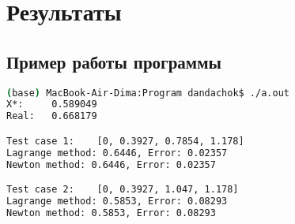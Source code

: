 \section*{Результаты}

\subsection*{Пример работы программы}

\begin{lstlisting}[language=bash]
(base) MacBook-Air-Dima:Program dandachok$ ./a.out
X*:     0.589049
Real:   0.668179

Test case 1:    [0, 0.3927, 0.7854, 1.178]
Lagrange method: 0.6446, Error: 0.02357
Newton method: 0.6446, Error: 0.02357

Test case 2:    [0, 0.3927, 1.047, 1.178]
Lagrange method: 0.5853, Error: 0.08293
Newton method: 0.5853, Error: 0.08293
\end{lstlisting}

\pagebreak